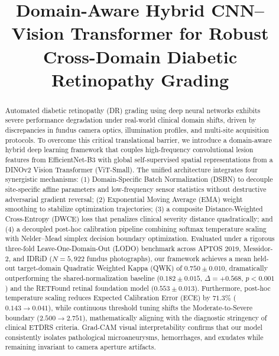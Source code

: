 \documentclass[conference]{IEEEtran}
\begin{document}
\title{Domain-Aware Hybrid CNN--Vision Transformer for Robust Cross-Domain Diabetic Retinopathy Grading}

\author{
}

\maketitle

\begin{abstract}
Automated diabetic retinopathy (DR) grading using deep neural networks exhibits severe performance degradation under real-world clinical domain shifts, driven by discrepancies in fundus camera optics, illumination profiles, and multi-site acquisition protocols. To overcome this critical translational barrier, we introduce a domain-aware hybrid deep learning framework that couples high-frequency convolutional lesion features from EfficientNet-B3 with global self-supervised spatial representations from a DINOv2 Vision Transformer (ViT-Small). The unified architecture integrates four synergistic mechanisms: (1) Domain-Specific Batch Normalization (DSBN) to decouple site-specific affine parameters and low-frequency sensor statistics without destructive adversarial gradient reversal; (2) Exponential Moving Average (EMA) weight smoothing to stabilize optimization trajectories; (3) a composite Distance-Weighted Cross-Entropy (DWCE) loss that penalizes clinical severity distance quadratically; and (4) a decoupled post-hoc calibration pipeline combining softmax temperature scaling with Nelder--Mead simplex decision boundary optimization. Evaluated under a rigorous three-fold Leave-One-Domain-Out (LODO) benchmark across APTOS 2019, Messidor-2, and IDRiD ($N=5,922$ fundus photographs), our framework achieves a mean held-out target-domain Quadratic Weighted Kappa (QWK) of $\mathbf{0.750 \pm 0.010}$, dramatically outperforming the shared-normalization baseline ($0.182 \pm 0.015$, $\Delta = +0.568$, $p < 0.001$) and the RETFound retinal foundation model ($0.553 \pm 0.013$). Furthermore, post-hoc temperature scaling reduces Expected Calibration Error (ECE) by $71.3\%$ ($0.143 \rightarrow 0.041$), while continuous threshold tuning shifts the Moderate-to-Severe boundary ($2.500 \rightarrow 2.751$), mathematically aligning with the diagnostic stringency of clinical ETDRS criteria. Grad-CAM visual interpretability confirms that our model consistently isolates pathological microaneurysms, hemorrhages, and exudates while remaining invariant to camera aperture artifacts.
\end{abstract}
\end{document}
